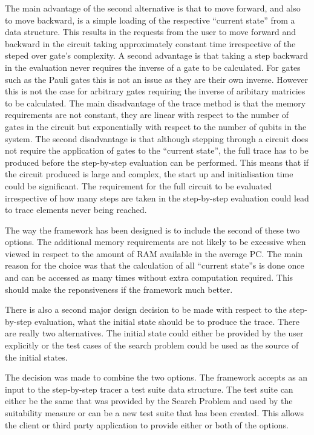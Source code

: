 The main advantage of the second alternative is that to move forward, and also to move backward, is a simple loading of the respective ``current state'' from a data structure.
This results in the requests from the user to move forward and backward in the circuit taking approximately constant time irrespective of the steped over gate's complexity.
A second advantage is that taking a step backward in the evaluation never requires the inverse of a gate to be calculated.
For gates such as the Pauli gates this is not an issue as they are their own inverse.
However this is not the case for arbitrary gates requiring the inverse of aribitary matricies to be calculated.
The main disadvantage of the trace method is that the memory requirements are not constant, they are linear with respect to the number of gates in the circuit but exponentially with respect to the number of qubits in the system.
The second disadvantage is that although stepping through a circuit does not require the application of gates to the ``current state'', the full trace has to be produced before the step-by-step evaluation can be performed.
This means that if the circuit produced is large and complex, the start up and initialisation time could be significant.
The requirement for the full circuit to be evaluated irrespective of how many steps are taken in the step-by-step evaluation could lead to trace elements never being reached.

The way the framework has been designed is to include the second of these two options.
The additional memory requirements are not likely to be excessive when viewed in respect to the amount of RAM available in the average PC.
The main reason for the choice was that the calculation of all ``current state''s is done once and can be accessed as many times without extra computation required.
This should make the reponsiveness if the framework much better.

There is also a second major design decision to be made with respect to the step-by-step evaluation, what the initial state should be to produce the trace.
There are really two alternatives.
The initial state could either be provided by the user explicitly or the test cases of the search problem could be used as the source of the initial  states.

The decision was made to combine the two options.
The framework accepts as an input to the step-by-step tracer a test suite data structure.
The test suite can either be the same that was provided by the Search Problem and used by the suitability measure or can be a new test suite that has been created.
This allows the client or third party application to provide either or both of the options.


